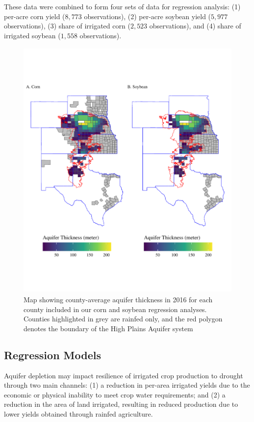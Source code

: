 \documentclass[
]{article}
\begin{document}
These data were combined to form four sets of data for regression analysis: (1) per-acre corn yield ($8,773$ observations), (2) per-acre soybean yield ($5,977$ observations), (3) share of irrigated corn ($2,523$ observations), and (4) share of irrigated soybean ($1,558$ observations).

\begin{figure}[H]

{\centering \includegraphics[width=6in,height=500px,]{../../Figures/g_map} 

}

\caption{Map showing county-average aquifer thickness in 2016 for each county included in our corn and soybean regression analyses. Counties highlighted in grey are rainfed only, and the red polygon denotes the boundary of the High Plains Aquifer system}\label{fig:sat-map}
\end{figure}

\hypertarget{regression-models}{%
\subsection{Regression Models}\label{regression-models}}

Aquifer depletion may impact resilience of irrigated crop production to drought through two main channels: (1) a reduction in per-area irrigated yields due to the economic or physical inability to meet crop water requirements; and (2) a reduction in the area of land irrigated, resulting in reduced production due to lower yields obtained through rainfed agriculture.
\end{document}
